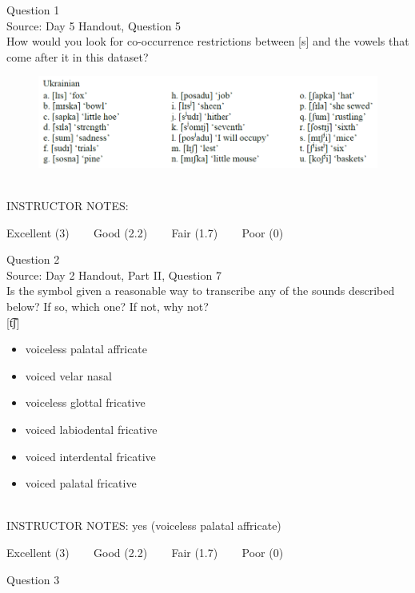 \documentclass[12pt]{article}
\begin{document}
{\large Question 1}\\

Source: Day 5 Handout, Question 5\\

How would you look for co-occurrence restrictions between [s] and the vowels that come after it in this dataset?\\

\begin{figure}[H]
\includegraphics{../images/ukrainian.png}
\end{figure}

~\\
INSTRUCTOR NOTES: 


\vfill
Excellent (3) ~~~ Good (2.2) ~~~ Fair (1.7) ~~~ Poor (0)
\newpage

{\large Question 2}\\

Source: Day 2 Handout, Part II, Question 7\\

Is the symbol given a reasonable way to transcribe any of the sounds described below? If so, which one? If not, why not?\\

{[t͡ʃ]}

\begin{itemize} \item voiceless palatal affricate \item voiced velar nasal \item voiceless glottal fricative \item voiced labiodental fricative \item voiced interdental fricative \item voiced palatal fricative \end{itemize}


~\\
INSTRUCTOR NOTES: yes (voiceless palatal affricate)


\vfill
Excellent (3) ~~~ Good (2.2) ~~~ Fair (1.7) ~~~ Poor (0)
\newpage

{\large Question 3}\\
\end{document}
